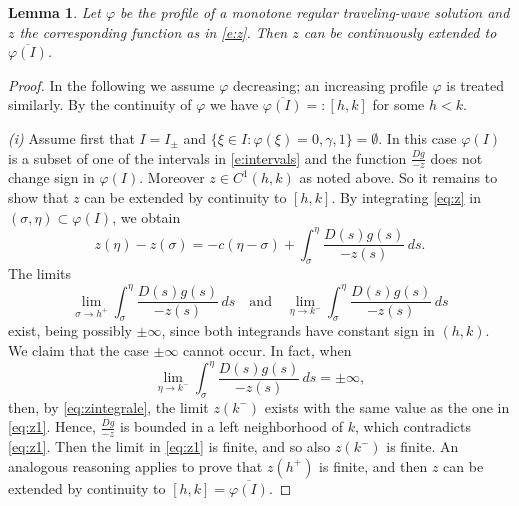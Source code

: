 \documentclass[11pt,a4paper]{article}
\newtheorem{lemma}{Lemma}[section]
\renewcommand{\phi}{\varphi}
\begin{document}
 \begin{lemma}\label{l:extended} Let $\phi$ be the profile of a monotone regular traveling-wave solution and  $z$ the corresponding function as in  \eqref{e:z}. Then $z$ can be continuously extended to $\overline{\phi(I)}$. 
 \end{lemma}
%
 \begin{proof} In the following we assume $\phi$ decreasing; an increasing profile  $\phi$ is treated similarly.  
 By the continuity of $\phi$ we have $\overline{\phi(I)}=:[h,k]$ for some $h<k$. 

\smallskip

{\em (i)} Assume first that  $I= I_{\pm}$ and $\{\xi\in I \colon \phi(\xi)= 0, \gamma, 1\}=\emptyset$. In this case $\phi(I)$ is a subset of one of the intervals in \eqref{e:intervals} and the function $\frac{Dg}{-z}$ does not change sign in $\phi(I)$. Moreover  $z \in C^1(h,k)$ as noted above. So  it remains to show that $z$ can be extended by continuity to $[h,k]$. By integrating \eqref{eq:z} in $(\sigma, \eta) \subset \phi(I)$, we obtain 
 \begin{equation}\label{eq:zintegrale}
 z(\eta)-z(\sigma)=-c(\eta -\sigma) +\int_{\sigma}^{\eta}\frac{D(s)g(s)}{-z(s)} \, ds.
 \end{equation}
The limits
 \[
\lim_{\sigma \to h^+} \int_{\sigma}^{\eta}\frac{D(s)g(s)}{-z(s)} \, ds \quad \text{and} \quad  \lim_{\eta \to k^-} \int_{\sigma}^{\eta}\frac{D(s)g(s)}{-z(s)} \, ds 
\]
exist, being possibly $\pm \infty$, since both integrands have constant sign in $(h,k)$. We claim that the case $\pm \infty$ cannot occur. In fact, when
 \begin{equation}\label{eq:z1}
 \lim_{\eta \to k^-} \int_{\sigma}^{\eta}\frac{D(s)g(s)}{-z(s)} \, ds =\pm\infty,
 \end{equation}
then, by \eqref{eq:zintegrale}, the limit  $z(k^-)$ exists with the same value as the one in \eqref{eq:z1}. Hence, $\frac{Dg}{-z}$ is bounded in a left neighborhood of $k$, which contradicts \eqref{eq:z1}. Then the limit in  \eqref{eq:z1} is finite, and so also $z(k^-)$ is finite. An analogous reasoning applies to prove that $z(h^+)$ is finite, and then $z$ can be extended by continuity to $[h,k]=\overline{\phi(I)}$. 

\smallskip


\end{proof}
\end{document}

